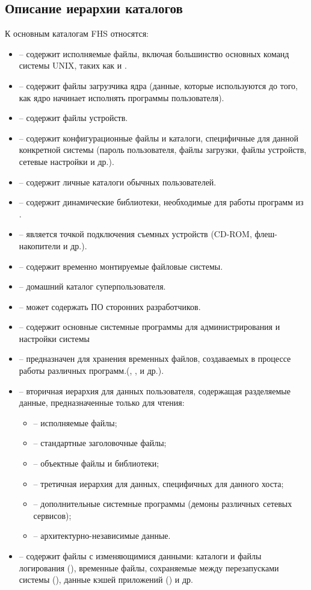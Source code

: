 \subsection{Описание иерархии каталогов}

К основным каталогам FHS относятся:
\begin{itemize}
	\item {} -- содержит исполняемые файлы, включая большинство основных команд системы UNIX, таких как  и .
	\item {} -- содержит файлы загрузчика ядра (данные, которые используются до того, как ядро начинает исполнять программы пользователя).
	\item {} -- содержит файлы устройств.
	\item {} -- содержит конфигурационные файлы и каталоги, специфичные для данной конкретной системы (пароль
	пользователя, файлы загрузки, файлы устройств, сетевые настройки и др.).
	\item {} -- содержит личные каталоги обычных пользователей.
	\item {} -- содержит динамические библиотеки, необходимые для работы программ из .
	\item {} -- является точкой подключения съемных устройств (CD-ROM, флеш-накопители и др.).
	\item {} -- содержит временно монтируемые файловые системы.
	\item {} -- домашний каталог суперпользователя.
	\item {} -- может содержать ПО сторонних разработчиков.
	\item {} -- содержит основные системные программы для администрирования и настройки системы 
	\item {} -- предназначен для хранения временных файлов, создаваемых в процессе работы различных программ.(, ,  и др.).
	\item {} -- вторичная иерархия для данных пользователя,  содержащая разделяемые данные, предназначенные только для чтения:
	\begin{itemize}[topsep=0em]
		\item {} -- исполняемые файлы;
		\item {} -- стандартные заголовочные файлы;
		\item {} -- объектные файлы и библиотеки;
		\item {} -- третичная иерархия для данных, специфичных для данного хоста;
		\item {} -- дополнительные системные программы (демоны различных сетевых сервисов);
		\item {} -- архитектурно-независимые данные.
	\end{itemize}
	\item {} -- содержит файлы с изменяющимися данными: каталоги и файлы логирования (), временные файлы, сохраняемые между перезапусками системы (), данные кэшей приложений () и др. 
\end{itemize}

